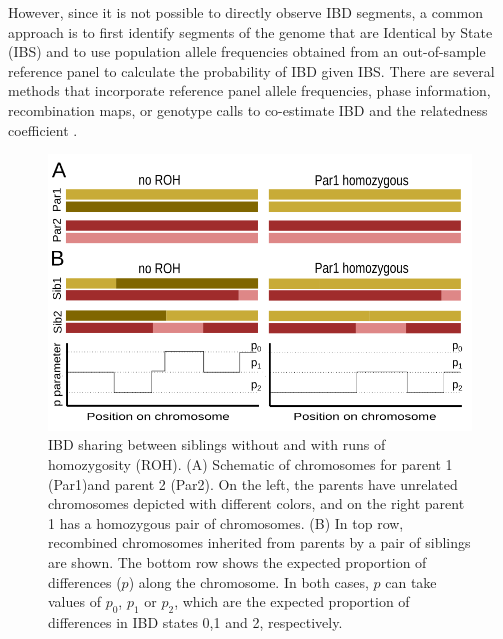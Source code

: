 \documentclass[12pt, letterpaper]{article}
\begin{document}
However, since it is not possible to directly observe IBD segments, a common approach is to first identify segments of the genome that are Identical by State (IBS) and to use population allele frequencies obtained from an out-of-sample reference panel to calculate the probability of IBD given IBS. There are several methods that incorporate reference panel allele frequencies, phase information, recombination maps, or genotype calls to co-estimate IBD and the relatedness coefficient \cite{huff_maximum-likelihood_2011,li_relationship_2014,thornton_estimating_2012, boehnke_accurate_1997,lynch_estimation_1999, purcell_plink_2007,manichaikul_robust_2010,gusev_whole_2009,nyerki_optimized_2022,browning_fast_2011,li_accurate_2014}.

\begin{figure}[h!]
    \includegraphics[width=18cm]{plots/inkscape_finalImg/schematic_sib_rev.png}
    \centering
    \caption{IBD sharing between siblings without and with runs of homozygosity (ROH). (A) Schematic of chromosomes for parent 1 (Par1)and parent 2 (Par2). On the left, the parents have unrelated chromosomes depicted with different colors, and on the right parent 1 has a homozygous pair of chromosomes. (B) In top row, recombined chromosomes inherited from parents by a pair of siblings are shown. The bottom row shows the expected proportion of differences ($p$) along the chromosome. In both cases, $p$ can take values of $p_0$, $p_1$ or $p_2$, which are the expected proportion of differences in IBD states 0,1 and 2, respectively.  }
    \label{fig0:schematic}
\end{figure}
\end{document}
